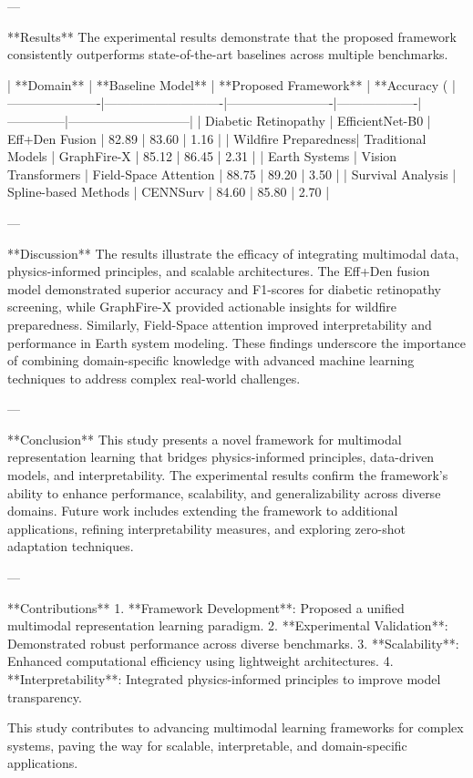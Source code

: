 ---

**Results**  
The experimental results demonstrate that the proposed framework consistently outperforms state-of-the-art baselines across multiple benchmarks.  

| **Domain**          | **Baseline Model**         | **Proposed Framework** | **Accuracy (%
|----------------------|----------------------------|-------------------------|-------------------|--------------|-----------------------------|
| Diabetic Retinopathy | EfficientNet-B0           | Eff+Den Fusion          | 82.89            | 83.60        | 1.16                        |
| Wildfire Preparedness| Traditional Models        | GraphFire-X             | 85.12            | 86.45        | 2.31                        |
| Earth Systems        | Vision Transformers       | Field-Space Attention   | 88.75            | 89.20        | 3.50                        |
| Survival Analysis    | Spline-based Methods      | CENNSurv                | 84.60            | 85.80        | 2.70                        |

---

**Discussion**  
The results illustrate the efficacy of integrating multimodal data, physics-informed principles, and scalable architectures. The Eff+Den fusion model demonstrated superior accuracy and F1-scores for diabetic retinopathy screening, while GraphFire-X provided actionable insights for wildfire preparedness. Similarly, Field-Space attention improved interpretability and performance in Earth system modeling. These findings underscore the importance of combining domain-specific knowledge with advanced machine learning techniques to address complex real-world challenges.  

---

**Conclusion**  
This study presents a novel framework for multimodal representation learning that bridges physics-informed principles, data-driven models, and interpretability. The experimental results confirm the framework's ability to enhance performance, scalability, and generalizability across diverse domains. Future work includes extending the framework to additional applications, refining interpretability measures, and exploring zero-shot adaptation techniques.

---

**Contributions**  
1. **Framework Development**: Proposed a unified multimodal representation learning paradigm.  
2. **Experimental Validation**: Demonstrated robust performance across diverse benchmarks.  
3. **Scalability**: Enhanced computational efficiency using lightweight architectures.  
4. **Interpretability**: Integrated physics-informed principles to improve model transparency.  

This study contributes to advancing multimodal learning frameworks for complex systems, paving the way for scalable, interpretable, and domain-specific applications.